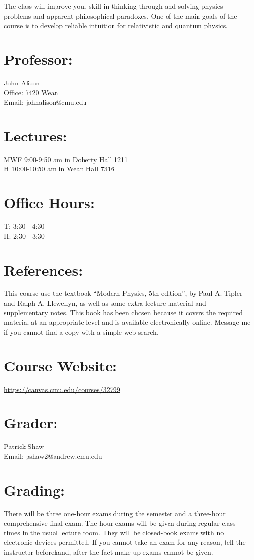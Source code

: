 \documentclass[margin,line]{res}
\begin{document}
\begin{resume}
The class will improve your skill in thinking through and solving physics problems and apparent philosophical paradoxes.
One of the main goals of the course is to develop reliable intuition for relativistic and quantum physics.



\section{Professor:}
John Alison\\
Office: 7420 Wean\\
Email: johnalison@cmu.edu

\section{Lectures:}
MWF 9:00-9:50 am in Doherty Hall 1211 \\
H  10:00-10:50 am in Wean Hall 7316


\section{Office Hours:}
T: 3:30 - 4:30\\
H: 2:30 - 3:30

\section{References:}
This course use the textbook “Modern Physics, 5th edition”, by Paul A. Tipler and Ralph A. Llewellyn, as well as some extra lecture material and supplementary notes.
This book has been chosen because it covers the required material at an appropriate level and is available electronically online.
Message me if you cannot find a copy with a simple web search.

\section{Course Website:}  
\href{https://canvas.cmu.edu/courses/32799}{https://canvas.cmu.edu/courses/32799}

\section{Grader:}
Patrick Shaw  \\
Email: pshaw2@andrew.cmu.edu

\clearpage

\section{Grading:} 
There will be three one-hour exams during the semester and a three-hour comprehensive final exam.
The hour exams will be given during regular class times in the usual lecture room.
They will be closed-book exams with no electronic devices permitted.
If you cannot take an exam for any reason, tell the instructor beforehand, after-the-fact make-up exams cannot be given.


\end{resume}
\end{document}
